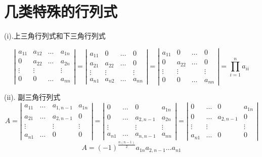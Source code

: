 \section{几类特殊的行列式}
\begin{definition}
	(i).上三角行列式和下三角行列式
	
	$$\left|\begin{matrix}
		a_{11}&a_{12}&\dots&a_{1n}\\
		0&a_{22}&\dots&a_{2n}\\
		\vdots&\vdots&\quad&\vdots\\
		0&0&\dots&a_{nn}
	\end{matrix} \right|=\left|\begin{matrix}
		a_{11}&0&\dots&0\\
		a_{21}&a_{22}&\dots&0\\
		\vdots&\vdots&\quad&\vdots\\
		a_{n1}&a_{n2}&\dots&a_{nn}
	\end{matrix} \right|=\left|\begin{matrix}
		a_{11}&0&\dots&0\\
		0&a_{22}&\dots&0\\
		\vdots&\vdots&\quad&\vdots\\
		0&0&\dots&a_{nn}
	\end{matrix} \right|=\prod\limits_{i=1}^{n}a_{ii}$$
	
	(ii). 副三角行列式
	$$A=\left|\begin{matrix}
		a_{11}&\dots&a_{1,n-1}&a_{1n}\\
		a_{21}&\dots&a_{2,n-1}&0\\
		\vdots&\quad&\vdots&\vdots\\
		a_{n1}&\dots&0&0
	\end{matrix} \right|=\left|\begin{matrix}
		0&\dots&0&a_{1n}\\
		0&\dots&a_{2,n-1}&a_{2n}\\
		\vdots&\quad&\vdots&\vdots\\
		a_{n1}&\dots&a_{n,n-1}&a_{nn}
	\end{matrix} \right|=\left|\begin{matrix}
		0&\dots&0&a_{1n}\\
		0&\dots&a_{2,n-1}&0\\
		\vdots&\vdots&\quad&\vdots\\
		a_{n1}&\dots&0&0
	\end{matrix} \right|$$
	$$A=(-1)^{\frac{n(n-1)}{2}}a_{1n}a_{2,n-1}\dots a_{n1}$$
	

\end{definition}

